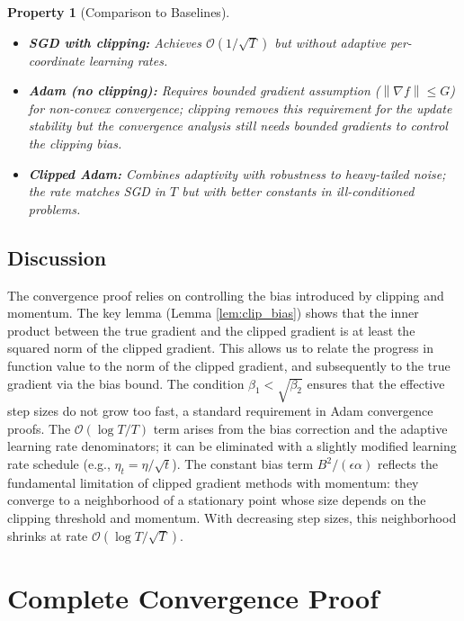 \documentclass{article}
\newtheorem{property}{Property}
\newcommand{\norm}[1]{\left\| #1 \right\|}
\begin{document}
\begin{property}[Comparison to Baselines]
    \begin{itemize}
        \item \textbf{SGD with clipping:} Achieves $\mathcal{O}(1/\sqrt{T})$ but without adaptive per-coordinate learning rates.
        \item \textbf{Adam (no clipping):} Requires bounded gradient assumption ($\norm{\nabla f} \le G$) for non-convex convergence; clipping removes this requirement for the update stability but the convergence analysis still needs bounded gradients to control the clipping bias.
        \item \textbf{Clipped Adam:} Combines adaptivity with robustness to heavy-tailed noise; the rate matches SGD in $T$ but with better constants in ill-conditioned problems.
    \end{itemize}
\end{property}

\subsection*{Discussion}
The convergence proof relies on controlling the bias introduced by clipping and momentum. The key lemma (Lemma \ref{lem:clip_bias}) shows that the inner product between the true gradient and the clipped gradient is at least the squared norm of the clipped gradient. This allows us to relate the progress in function value to the norm of the clipped gradient, and subsequently to the true gradient via the bias bound. The condition $\beta_1 < \sqrt{\beta_2}$ ensures that the effective step sizes do not grow too fast, a standard requirement in Adam convergence proofs. The $\mathcal{O}(\log T / T)$ term arises from the bias correction and the adaptive learning rate denominators; it can be eliminated with a slightly modified learning rate schedule (e.g., $\eta_t = \eta/\sqrt{t}$). The constant bias term $B^2/(\epsilon \alpha)$ reflects the fundamental limitation of clipped gradient methods with momentum: they converge to a neighborhood of a stationary point whose size depends on the clipping threshold and momentum. With decreasing step sizes, this neighborhood shrinks at rate $\mathcal{O}(\log T/\sqrt{T})$.

\section*{Complete Convergence Proof}
\end{document}
